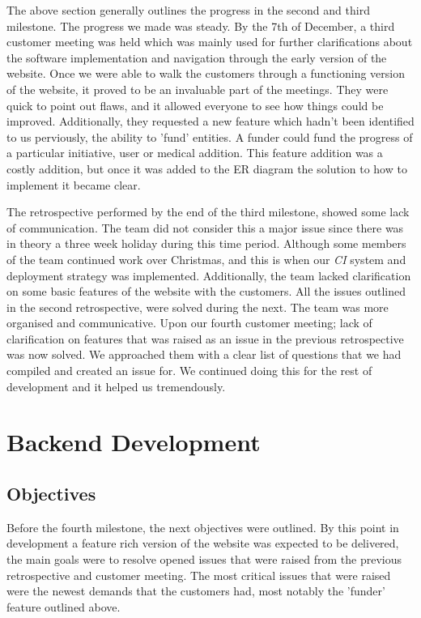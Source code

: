 \documentclass{l3proj}
\begin{document}
The above section generally outlines the progress in the second and third milestone. The progress we made was steady. By the 7th of December, a third customer meeting was held which was mainly used for further clarifications about the software implementation and navigation through the early version of the website. Once we were able to walk the customers through a functioning version of the website, it proved to be an invaluable part of the meetings. They were quick to point out flaws, and it allowed everyone to see how things could be improved. Additionally, they requested a new feature which hadn't been identified to us perviously, the ability to 'fund' entities. A funder could fund the progress of a particular initiative, user or medical addition. This feature addition was a costly addition, but once it was added to the ER diagram the solution to how to implement it became clear.

The retrospective performed by the end of the third milestone, showed some lack of communication. The team did not consider this a major issue since there was in theory a three week holiday during this time period. Although some members of the team continued work over Christmas, and this is when our \textit{CI} system and deployment strategy was implemented. Additionally, the team lacked clarification on some basic features of the website with the customers. All the issues outlined in the second retrospective, were solved during the next. The team was more organised and communicative. Upon our fourth customer meeting; lack of clarification on features that was raised as an issue in the previous retrospective was now solved. We approached them with a clear list of questions that we had compiled and created an issue for. We continued doing this for the rest of development and it helped us tremendously.

\section{Backend Development}
\label{sec:backend}

\subsection{Objectives}
\label{sec:backend-objectives}

Before the fourth milestone, the next objectives were outlined. By this point in development a feature rich version of the website was expected to be delivered, the main goals were to resolve opened issues that were raised from the previous retrospective and customer meeting. The most critical issues that were raised were the newest demands that the customers had, most notably the 'funder' feature outlined above.
\end{document}
